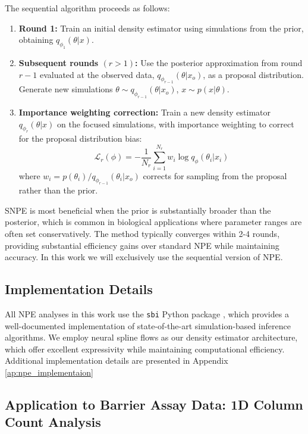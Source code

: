 \documentclass{article}
\begin{document}
The sequential algorithm proceeds as follows:

\begin{enumerate}
	\item \textbf{Round 1:} Train an initial density estimator using simulations from the prior, obtaining $q_{\phi_1}(\theta | x)$.
	
	\item \textbf{Subsequent rounds $(r > 1)$:} Use the posterior approximation from round $r-1$ evaluated at the observed data, $q_{\phi_{r-1}}(\theta | x_o)$, as a proposal distribution. Generate new simulations $\theta \sim q_{\phi_{r-1}}(\theta | x_o)$, $x \sim p(x|\theta)$.
	
	\item \textbf{Importance weighting correction:} Train a new density estimator $q_{\phi_r}(\theta | x)$ on the focused simulations, with importance weighting to correct for the proposal distribution bias:
	\begin{equation}
		\mathcal{L}_r(\phi) = -\frac{1}{N_r} \sum_{i=1}^{N_r} w_i \log q_\phi(\theta_i | x_i)
	\end{equation}
	where $w_i = p(\theta_i) / q_{\phi_{r-1}}(\theta_i | x_o)$ corrects for sampling from the proposal rather than the prior.
\end{enumerate}

SNPE is most beneficial when the prior is substantially broader than the posterior, which is common in biological applications where parameter ranges are often set conservatively. The method typically converges within 2-4 rounds, providing substantial efficiency gains over standard NPE while maintaining accuracy. In this work we will exclusively use the sequential version of NPE.

\subsection{Implementation Details}

All NPE analyses in this work use the \texttt{sbi} Python package \cite{2020JOSS....5.2505T}, which provides a well-documented implementation of state-of-the-art simulation-based inference algorithms. We employ neural spline flows \cite{durkan2019neural} as our density estimator architecture, which offer excellent expressivity while maintaining computational efficiency. Additional implementation details are presented in Appendix \ref{ap:npe_implementaion}



\subsection{Application to Barrier Assay Data: 1D Column Count Analysis} \label{sec:1d_results}
\end{document}
